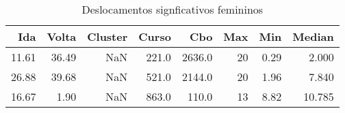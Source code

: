 \begin{table}
\centering
\caption{Deslocamentos signficativos femininos}
\label{tab:Salarios_Desequlibrio_F}
\begin{tabular}{rrrrrrrr}
\toprule
  Ida &  Volta &  Cluster &  Curso &    Cbo &  Max &  Min &  Median \\
\midrule
11.61 &  36.49 &      NaN &  221.0 & 2636.0 &   20 & 0.29 &   2.000 \\
26.88 &  39.68 &      NaN &  521.0 & 2144.0 &   20 & 1.96 &   7.840 \\
16.67 &   1.90 &      NaN &  863.0 &  110.0 &   13 & 8.82 &  10.785 \\
\bottomrule
\end{tabular}
\end{table}
